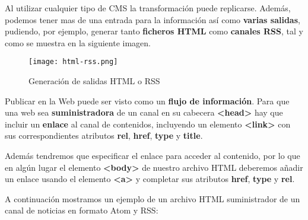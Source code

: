 Al utilizar cualquier tipo de CMS la transformación puede replicarse. Además, podemos tener mas de una entrada para la información así como \textbf{varias salidas}, pudiendo, por ejemplo, generar tanto \textbf{ficheros HTML} como \textbf{canales RSS}, tal y como se muestra en la siguiente imagen.

    \begin{figure}[H]
    \centering
    \texttt{[image: html-rss.png]}
    \caption{Generación de salidas HTML o RSS}
\end{figure}

Publicar en la Web puede ser visto como un \textbf{flujo de información}. Para que una web sea \textbf{suministradora} de un canal en su cabecera \textbf{<head>} hay que incluir un \textbf{enlace} al canal de contenidos, incluyendo un elemento \textbf{<link>} con sus correspondientes atributos \textbf{rel}, \textbf{href}, \textbf{type} y \textbf{title}.

Además tendremos que especificar el enlace para acceder al contenido, por lo que en algún lugar el elemento \textbf{<body>} de nuestro archivo HTML deberemos añadir un enlace usando el elemento \textbf{<a>} y completar sus atributos \textbf{href}, \textbf{type} y \textbf{rel}.

A continuación mostramos un ejemplo de un archivo HTML suministrador de un canal de noticias en formato Atom y RSS:

